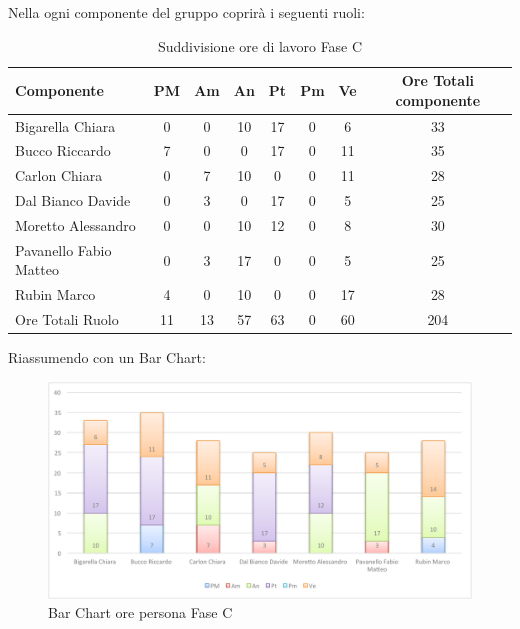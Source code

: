 				Nella  ogni componente del gruppo \groupname{} coprirà i seguenti ruoli:
				\begin{table}[H]
					\begin{center}
						\begin{tabular}{| l | c | c | c | c | c | c | c |}
							\hline
							Componente 					& PM	& Am	 & An 		& Pt 		& Pm 	& Ve 	& Ore Totali componente \\ \hline
							
							Bigarella Chiara 			& 0		& 0		& 10 		& 17 		& 0		& 6 		& 33 \\
							Bucco Riccardo 				& 7 	& 0		& 0			& 17 		& 0		& 11 		& 35 \\
							Carlon Chiara	 			& 0		& 7 	& 10 		& 0			& 0		& 11 		& 28 \\
							Dal Bianco Davide 			& 0		& 3		& 0			& 17 		& 0		& 5			& 25 \\
							Moretto Alessandro 			& 0		& 0 	& 10 		& 12 		& 0		& 8 		& 30 \\
							Pavanello Fabio Matteo	 	& 0		& 3		& 17 		& 0			& 0		& 5			& 25 \\
							Rubin Marco					& 4 	& 0		& 10 		& 0			& 0		& 17 		& 28 \\ \hline \hline
							
							Ore Totali Ruolo 			& 11 	& 13 	& 57 		& 63 		& 0		& 60		& 204\\ \hline
						\end{tabular}
					\end{center}
					\caption{Suddivisione ore di lavoro Fase C}
				\end{table}
				Riassumendo con un Bar Chart:
				\begin{figure}[H]\centering
					\includegraphics[width=\textwidth]{PianoDiProgetto/Pics/ChartOreFaseC.pdf}
					\caption{Bar Chart ore persona Fase C}
				\end{figure}
